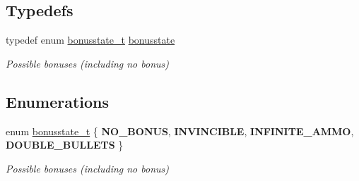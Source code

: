 \subsection*{Typedefs}
\begin{DoxyCompactItemize}
\item 
\hypertarget{group__player_ga3ab4abfc8d967315be3486178b91d2d9}{}\label{group__player_ga3ab4abfc8d967315be3486178b91d2d9} 
typedef enum \hyperlink{group__player_ga5bf5ff684470128c077a0e18436a6243}{bonusstate\+\_\+t} \hyperlink{group__player_ga3ab4abfc8d967315be3486178b91d2d9}{bonusstate}
\begin{DoxyCompactList}\small\item\em Possible bonuses (including no bonus) \end{DoxyCompactList}\end{DoxyCompactItemize}
\subsection*{Enumerations}
\begin{DoxyCompactItemize}
\item 
\hypertarget{group__player_ga5bf5ff684470128c077a0e18436a6243}{}\label{group__player_ga5bf5ff684470128c077a0e18436a6243} 
enum \hyperlink{group__player_ga5bf5ff684470128c077a0e18436a6243}{bonusstate\+\_\+t} \{ {\bfseries N\+O\+\_\+\+B\+O\+N\+US}, 
{\bfseries I\+N\+V\+I\+N\+C\+I\+B\+LE}, 
{\bfseries I\+N\+F\+I\+N\+I\+T\+E\+\_\+\+A\+M\+MO}, 
{\bfseries D\+O\+U\+B\+L\+E\+\_\+\+B\+U\+L\+L\+E\+TS}
 \}\begin{DoxyCompactList}\small\item\em Possible bonuses (including no bonus) \end{DoxyCompactList}
\end{DoxyCompactItemize}
